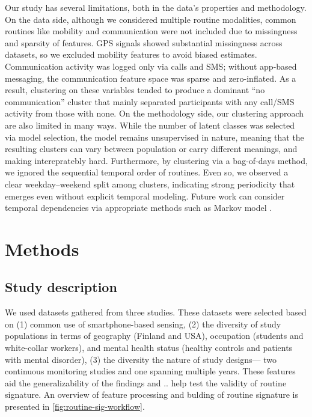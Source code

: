 \documentclass[pdflatex,sn-vancouver,Numbered]{bst/sn-jnl}%
\theoremstyle{thmstyleone}%
\theoremstyle{thmstyletwo}%
\theoremstyle{thmstylethree}%
\begin{document}
Our study has several limitations, both in the data's properties and methodology. On the data side, although we considered multiple routine modalities, common routines like mobility and communication were not included due to missingness and sparsity of features. GPS signals showed substantial missingness across datasets, so we excluded mobility features to avoid biased estimates. Communication activity was logged only via calls and SMS; without app-based messaging, the communication feature space was sparse and zero-inflated. As a result, clustering on these variables tended to produce a dominant “no communication” cluster that mainly separated participants with any call/SMS activity from those with none. On the methodology side, our clustering approach are also limited in many ways. While the number of latent classes was selected via model selection, the model remains unsupervised in nature, meaning that the resulting clusters can vary between population or carry different meanings, and making interepratebly hard. Furthermore, by clustering via a bag-of-days method, we ignored the sequential temporal order of routines. Even so, we observed a clear weekday–weekend split among clusters, indicating strong periodicity that emerges even without explicit temporal modeling. Future work can consider temporal dependencies via appropriate methods such as Markov model \cite{liuIntraindividualPhenotypingDepression2024, leaningUncoveringSocialStateMoMo-Mood025}.

\section*{Methods}\label{sec:methods}  

\subsection*{Study description}\label{sec:methods:study_desc}  

We used datasets gathered from three studies. These datasets were selected based on (1) common use of smartphone-based sensing, (2) the diversity of study populations in terms of geography (Finland and USA), occupation (students and white-collar workers), and mental health status (healthy controls and patients with mental disorder), (3) the diversity the nature of study designs— two continuous monitoring studies and one spanning multiple years. These features aid the generalizability of the findings and .. help test the validity of routine signature. An overview of feature processing and bulding of routine signature is presented in \autoref{fig:routine-sig-workflow}.
\end{document}
